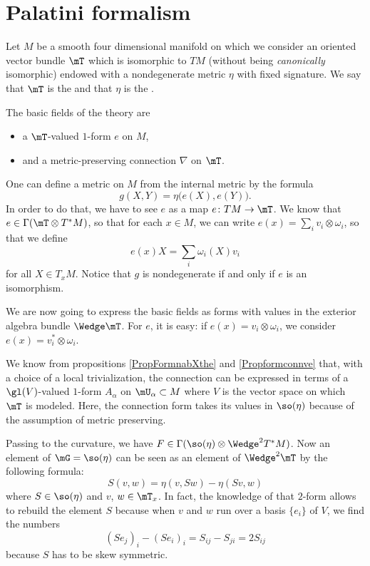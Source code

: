 \section{Palatini formalism}

Let $M$ be a smooth four dimensional manifold on which we consider an oriented vector bundle $\mT$ which is isomorphic to $TM$ (without being \emph{canonically} isomorphic) endowed with a nondegenerate metric $\eta$ with fixed signature. We say that $\mT$ is the  and that $\eta$ is the .

The basic fields of the theory are
\begin{itemize}
\item a $\mT$-valued $1$-form $e$ on $M$,
\item and a metric-preserving connection $\nabla$ on $\mT$.
\end{itemize}
One can define a metric on $M$ from the internal metric by the formula
\begin{equation}
  g(X,Y)=\eta\big( e(X),e(Y) \big).
\end{equation}
In order to do that, we have to see $e$ as a map $e\colon TM\to \mT$. We know that $e\in\Gamma(\mT\otimes T^*M)$, so that for each $x\in M$, we can write $e(x)=\sum_iv_i\otimes\omega_i$, so that we define 
\[ 
  e(x)X=\sum_i\omega_i(X)v_i
\]
for all $X\in T_xM$. Notice that $g$ is nondegenerate if and only if $e$ is an isomorphism.

We are now going to express the basic fields as forms with values in the exterior algebra bundle $\Wedge\mT$. For $e$, it is easy: if $e(x)=v_i\otimes \omega_i$, we consider $e(x)=v_i^*\otimes\omega_i$. 

We know from propositions \ref{PropFormnabXthe} and \ref{Propformconnve} that, with a choice of a local trivialization, the connection can be expressed in terms of a $\gl(V)$-valued $1$-form $A_{\alpha}$ on $\mU_{\alpha}\subset M$ where $V$ is the vector space on which $\mT$ is modeled. Here, the connection form takes its values in $\so(\eta)$ because of the assumption of metric preserving.

Passing to the curvature, we have $F\in\Gamma(\so(\eta)\otimes\Wedge^2T^*M)$. Now an element of $\mG=\so(\eta)$ can be seen as an element of $\Wedge^2\mT$ by the following formula:
\begin{equation}
S(v,w)=\eta(v,Sw)-\eta(Sv,w)
\end{equation}
where $S\in\so(\eta)$ and $v$, $w\in \mT_x$. In fact, the knowledge of that $2$-form allows to rebuild the element $S$ because when $v$ and $w$ run over a basis $\{ e_i \}$ of $V$, we find the numbers
\[ 
  (Se_j)_{i}-(Se_i)_i=S_{ij}-S_{ji}=2S_{ij}
\]
because $S$ has to be skew symmetric.

